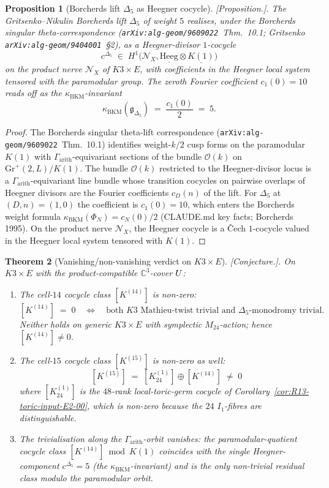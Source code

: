 \documentclass[11pt]{amsart}
\newtheorem{theorem}{Theorem}[section]
\newtheorem{proposition}[theorem]{Proposition}
\providecommand{\kBKM}{\kappa_{\mathrm{BKM}}}
\providecommand{\C}{\mathbb{C}}
\providecommand{\cN}{\mathcal{N}}
\providecommand{\cO}{\mathcal{O}}
\providecommand{\ClaimStatusConjectured}{[\emph{Conjecture.}]}
\providecommand{\ClaimStatusProposition}{[\emph{Proposition.}]}
\begin{document}
\begin{proposition}[Borcherds lift $\Delta_5$ as Heegner cocycle]
\label{prop:R13-borcherds-heegner}
\ClaimStatusProposition.
The Gritsenko--Nikulin Borcherds lift $\Delta_5$ of weight $5$
realises, under the Borcherds singular theta-correspondence
(\texttt{arXiv:alg-geom/9609022}~Thm.~10.1; Gritsenko
\texttt{arXiv:alg-geom/9404001}~\S 2), as a Heegner-divisor $1$-cocycle
\[
  c^{\Delta_5} \;\in\; H^1\bigl(\cN_X,
  \underline{\mathrm{Heeg}} \otimes \underline{K(1)}\bigr)
\]
on the product nerve $\cN_X$ of $K3 \times E$, with coefficients in
the Heegner local system tensored with the paramodular group. The zeroth
Fourier coefficient $c_1(0) = 10$ reads off as the $\kBKM$-invariant
\[
  \kBKM(\mathfrak{g}_{\Delta_5}) \;=\;
  \frac{c_1(0)}{2} \;=\; 5.
\]
\end{proposition}

\begin{proof}
The Borcherds singular theta-lift correspondence
(\texttt{arXiv:alg-geom/9609022}~Thm.~10.1) identifies weight-$k/2$
cusp forms on the paramodular $K(1)$ with
$\Gamma_{\mathrm{arith}}$-equivariant sections of the bundle
$\cO(k)$ on $\mathrm{Gr}^+(2, L) / K(1)$. The bundle
$\cO(k)$ restricted to the Heegner-divisor locus is a
$\Gamma_{\mathrm{arith}}$-equivariant line bundle whose transition
cocycles on pairwise overlaps of Heegner divisors are the Fourier
coefficients $c_D(n)$ of the lift. For $\Delta_5$ at $(D, n) = (1, 0)$
the coefficient is $c_1(0) = 10$, which enters the Borcherds weight
formula $\kBKM(\Phi_N) = c_N(0)/2$ (CLAUDE.md key facts; Borcherds
1995). On the product nerve $\cN_X$, the Heegner cocycle is a
\v{C}ech $1$-cocycle valued in the Heegner local system tensored
with $K(1)$.
\end{proof}

\begin{theorem}[Vanishing/non-vanishing verdict on $K3 \times E$]
\label{thm:R13-vanishing-verdict}
\ClaimStatusConjectured.
On $K3 \times E$ with the product-compatible $\C^3$-cover $U$:
\begin{enumerate}[leftmargin=2em]
\item The cell-$14$ cocycle class $[K^{(14)}]$ is non-zero:
\[
  [K^{(14)}] \;=\; 0 \quad \Leftrightarrow \quad
  \text{both } K3 \text{ Mathieu-twist trivial and
  } \Delta_5 \text{-monodromy trivial}.
\]
Neither holds on generic $K3 \times E$ with symplectic $M_{24}$-action;
hence $[K^{(14)}] \neq 0$.
\item The cell-$15$ cocycle class $[K^{(15)}]$ is non-zero as well:
\[
  [K^{(15)}] \;=\; [K^{(1)}_{24}] \oplus [K^{(14)}] \;\neq\; 0
\]
where $[K^{(1)}_{24}]$ is the $48$-rank local-toric-germ cocycle of
Corollary~\ref{cor:R13-toric-input-E2-00}, which is non-zero because
the $24$ $I_1$-fibres are distinguishable.
\item The \emph{trivialisation} along the $\Gamma_{\mathrm{arith}}$-orbit
vanishes: the paramodular-quotient cocycle class
$[K^{(14)}] \bmod K(1)$ coincides with the single Heegner-component
$c^{\Delta_5} = 5$ (the $\kBKM$-invariant) and is the only
non-trivial residual class modulo the paramodular orbit.
\end{enumerate}
\end{theorem}
\end{document}
